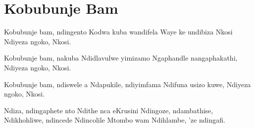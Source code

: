 \starttocol
\chapter{Kobubunje Bam}
\nexttocol
\hfill{\it }
\stoptocol
\starttocol
\startlines
{\sc Kobubunje} bam, ndingento
Kodwa kuba wandifela
Waye ke undibiza Nkosi
Ndiyeza ngoko, Nkosi.

Kobubunje bam, nakuba
Ndidlavulwe yimizamo
Ngaphandle nangaphakathi,
Ndiyeza ngoko, Nkosi.

Kobubunje bam, ndiswele  a
Ndapukile, ndiyimfama 
Ndifuna usizo kuwe,
Ndiyeza ngoko, Nkosi.

Ndiza, ndingaphete nto
Ndithe nca eKrusini
Ndingoze, ndambathise,
Ndikhohliwe, ndincede
Ndincolile Mtombo wam
Ndihlambe, 'ze ndingafi.

\stoplines
\nexttocol

\stoptocol

